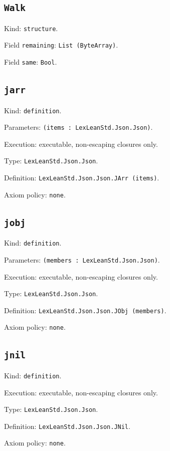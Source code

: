 \documentclass[11pt]{article}
\begin{document}
\subsection*{\texttt{Walk}}
\noindent Kind: \texttt{structure}.\par
\noindent Field \texttt{remaining}: \texttt{List (ByteArray)}.\par
\noindent Field \texttt{same}: \texttt{Bool}.\par
\subsection*{\texttt{jarr}}
\noindent Kind: \texttt{definition}.\par
\noindent Parameters: \texttt{(items : LexLeanStd.Json.Json)}.\par
\noindent Execution: executable, non-escaping closures only.\par
\noindent Type: \texttt{LexLeanStd.Json.Json}.\par
\noindent Definition: \texttt{LexLeanStd.Json.Json.JArr (items)}.\par
\noindent Axiom policy: \texttt{none}.\par
\subsection*{\texttt{jobj}}
\noindent Kind: \texttt{definition}.\par
\noindent Parameters: \texttt{(members : LexLeanStd.Json.Json)}.\par
\noindent Execution: executable, non-escaping closures only.\par
\noindent Type: \texttt{LexLeanStd.Json.Json}.\par
\noindent Definition: \texttt{LexLeanStd.Json.Json.JObj (members)}.\par
\noindent Axiom policy: \texttt{none}.\par
\subsection*{\texttt{jnil}}
\noindent Kind: \texttt{definition}.\par
\noindent Execution: executable, non-escaping closures only.\par
\noindent Type: \texttt{LexLeanStd.Json.Json}.\par
\noindent Definition: \texttt{LexLeanStd.Json.Json.JNil}.\par
\noindent Axiom policy: \texttt{none}.\par
\end{document}
